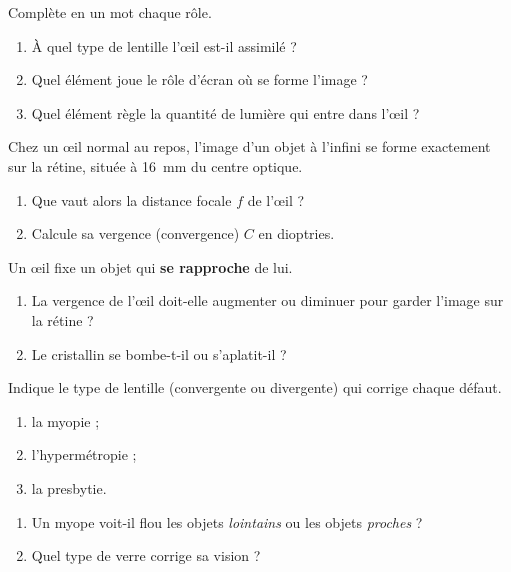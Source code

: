 \documentclass[11pt,a4paper]{article}
\begin{document}

\begin{exo}
Complète en un mot chaque rôle.
\begin{enumerate}[label=\alph*)]
  \item À quel type de lentille l'\oe il est-il assimilé ?
  \item Quel élément joue le rôle d'écran où se forme l'image ?
  \item Quel élément règle la quantité de lumière qui entre dans l'\oe il ?
\end{enumerate}
\end{exo}

\begin{exo}
Chez un \oe il normal au repos, l'image d'un objet à l'infini se forme exactement sur la rétine,
située à \qty{16}{\mm} du centre optique.
\begin{enumerate}[label=\alph*)]
  \item Que vaut alors la distance focale $f$ de l'\oe il ?
  \item Calcule sa vergence (convergence) $C$ en dioptries.
\end{enumerate}
\end{exo}

\begin{exo}
Un \oe il fixe un objet qui \textbf{se rapproche} de lui.
\begin{enumerate}[label=\alph*)]
  \item La vergence de l'\oe il doit-elle augmenter ou diminuer pour garder l'image sur la rétine ?
  \item Le cristallin se bombe-t-il ou s'aplatit-il ?
\end{enumerate}
\end{exo}

\begin{exo}
Indique le type de lentille (convergente ou divergente) qui corrige chaque défaut.
\begin{enumerate}[label=\alph*)]
  \item la myopie ;
  \item l'hypermétropie ;
  \item la presbytie.
\end{enumerate}
\end{exo}

\begin{exo}[le myope]
\begin{enumerate}[label=\alph*)]
  \item Un myope voit-il flou les objets \emph{lointains} ou les objets \emph{proches} ?
  \item Quel type de verre corrige sa vision ?
\end{enumerate}
\end{exo}
\end{document}
